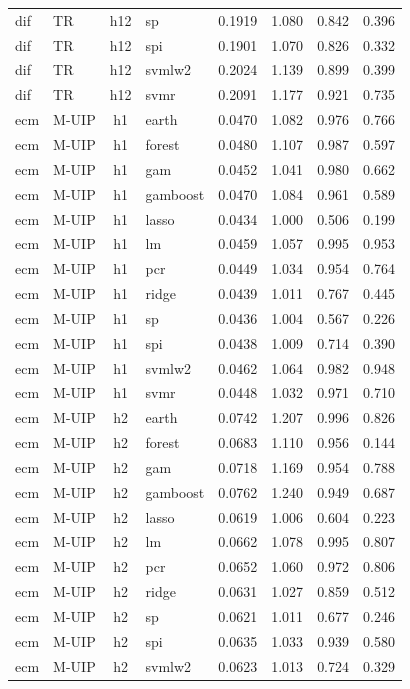 \begin{ThreePartTable}
\begin{longtable}[t]{llclcccc}
dif & TR & h12 & sp & 0.1919 & 1.080 & 0.842 & 0.396\\
dif & TR & h12 & spi & 0.1901 & 1.070 & 0.826 & 0.332\\
dif & TR & h12 & svmlw2 & 0.2024 & 1.139 & 0.899 & 0.399\\
dif & TR & h12 & svmr & 0.2091 & 1.177 & 0.921 & 0.735\\
\addlinespace
ecm & M-UIP & h1 & earth & 0.0470 & 1.082 & 0.976 & 0.766\\
ecm & M-UIP & h1 & forest & 0.0480 & 1.107 & 0.987 & 0.597\\
ecm & M-UIP & h1 & gam & 0.0452 & 1.041 & 0.980 & 0.662\\
ecm & M-UIP & h1 & gamboost & 0.0470 & 1.084 & 0.961 & 0.589\\
ecm & M-UIP & h1 & lasso & 0.0434 & 1.000 & 0.506 & 0.199\\
ecm & M-UIP & h1 & lm & 0.0459 & 1.057 & 0.995 & 0.953\\
ecm & M-UIP & h1 & pcr & 0.0449 & 1.034 & 0.954 & 0.764\\
ecm & M-UIP & h1 & ridge & 0.0439 & 1.011 & 0.767 & 0.445\\
ecm & M-UIP & h1 & sp & 0.0436 & 1.004 & 0.567 & 0.226\\
ecm & M-UIP & h1 & spi & 0.0438 & 1.009 & 0.714 & 0.390\\
ecm & M-UIP & h1 & svmlw2 & 0.0462 & 1.064 & 0.982 & 0.948\\
ecm & M-UIP & h1 & svmr & 0.0448 & 1.032 & 0.971 & 0.710\\
\addlinespace
ecm & M-UIP & h2 & earth & 0.0742 & 1.207 & 0.996 & 0.826\\
ecm & M-UIP & h2 & forest & 0.0683 & 1.110 & 0.956 & 0.144\\
ecm & M-UIP & h2 & gam & 0.0718 & 1.169 & 0.954 & 0.788\\
ecm & M-UIP & h2 & gamboost & 0.0762 & 1.240 & 0.949 & 0.687\\
ecm & M-UIP & h2 & lasso & 0.0619 & 1.006 & 0.604 & 0.223\\
ecm & M-UIP & h2 & lm & 0.0662 & 1.078 & 0.995 & 0.807\\
ecm & M-UIP & h2 & pcr & 0.0652 & 1.060 & 0.972 & 0.806\\
ecm & M-UIP & h2 & ridge & 0.0631 & 1.027 & 0.859 & 0.512\\
ecm & M-UIP & h2 & sp & 0.0621 & 1.011 & 0.677 & 0.246\\
ecm & M-UIP & h2 & spi & 0.0635 & 1.033 & 0.939 & 0.580\\
ecm & M-UIP & h2 & svmlw2 & 0.0623 & 1.013 & 0.724 & 0.329\\

\end{longtable}
\end{ThreePartTable}
